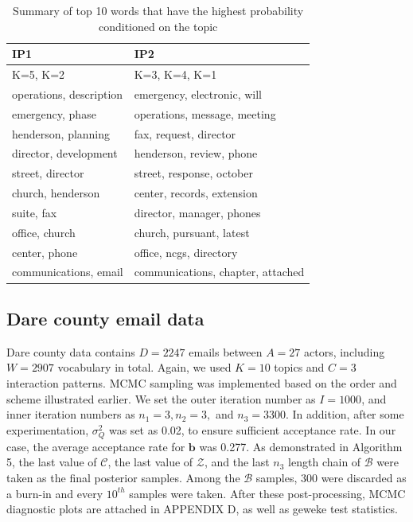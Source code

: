 \documentclass[a4paper]{article}
\begin{document}
 \begin{table}[ht]
 	\centering
 	\begin{tabular}{|l||l||}
 		\hline
 		{\textbf{IP1} }&{\textbf{IP2} }\\
 		\hline\hline
 		K=5, K=2 & K=3, K=4, K=1\\
 		\hline
 	operations, description&emergency, electronic, will\\
 	emergency, phase & operations, message, meeting\\
 	henderson, planning& fax, request, director\\
 	director, development & henderson, review, phone\\
 	street, director & street, response, october\\
 	church, henderson& center, records, extension\\
 	suite, fax & director, manager, phones\\
 	office, church & church, pursuant, latest\\ 
 	center, phone & office, ncgs, directory\\
 	communications, email & communications, chapter, attached\\
 		\hline
 	\end{tabular}
 	\caption {Summary of top 10 words that have the highest probability conditioned on the topic}
 	\label{table:VancewordsMCMC}
 \end{table}
 \subsection{Dare county email data} \label{subsec: Dare county email data}
 Dare county data contains $D=2247$ emails between $A=27$ actors, including $W=2907$ vocabulary in total. Again, we used $K=10$ topics and $C=3$ interaction patterns. MCMC sampling was implemented based on the order and scheme illustrated earlier. We set the outer iteration number as $I=1000$, and inner iteration numbers as $n_1=3, n_2=3,$ and $n_3=3300$. In addition, after some experimentation, $\sigma^2_Q$ was set as 0.02, to ensure sufficient acceptance rate. In our case, the average acceptance rate for $\boldsymbol{b}$ was 0.277. As demonstrated in Algorithm 5, the last value of $\mathcal{C}$, the last value of $\mathcal{Z}$, and the last $n_3$ length chain of $\mathcal{B}$ were taken as the final posterior samples. Among the $\mathcal{B}$ samples, 300 were discarded as a burn-in and every $10^{th}$ samples were taken. After these post-processing, MCMC diagnostic plots are attached in APPENDIX D, as well as geweke test statistics.
 
\end{document}
